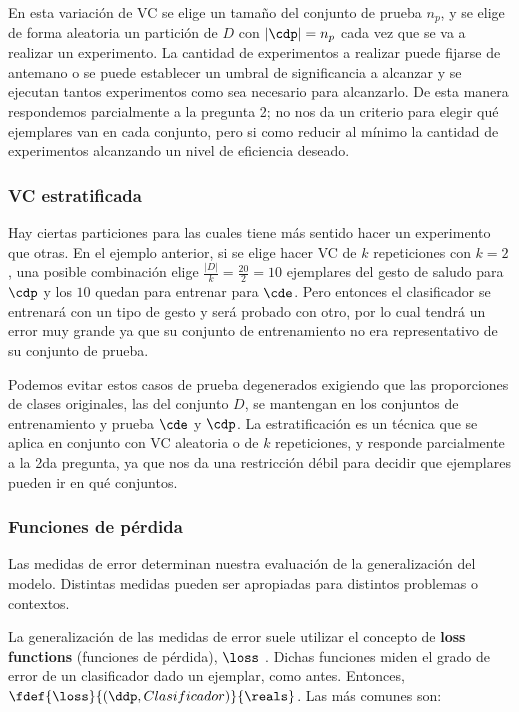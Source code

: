 En esta variación de VC se elige un tamaño del conjunto de prueba $n_p$, y se elige de forma aleatoria un partición de $D$ con $|\cdp|=n_p$ cada vez que se va a realizar un experimento. La cantidad de experimentos a realizar puede fijarse de antemano o se puede establecer un umbral de significancia a alcanzar y se ejecutan tantos experimentos como sea necesario para alcanzarlo. De esta manera respondemos parcialmente a la pregunta 2; no nos da un criterio para elegir qué ejemplares van en cada conjunto, pero si como reducir al mínimo la cantidad de experimentos alcanzando un nivel de eficiencia deseado.


\subsubsection{VC estratificada}

Hay ciertas particiones para las cuales tiene más sentido hacer un experimento que otras. En el ejemplo anterior, si se elige hacer VC de $k$ repeticiones con $k=2$, una posible combinación elige $\frac{|D|}{k}=\frac{20}{2}=10$ ejemplares del gesto de saludo para $\cdp$ y los $10$ quedan para entrenar para $\cde$. Pero entonces el clasificador se entrenará con un tipo de gesto y será probado con otro, por lo cual tendrá un error muy grande ya que su conjunto de entrenamiento no era representativo de su conjunto de prueba.

Podemos evitar estos casos de prueba degenerados exigiendo que las proporciones de clases originales, las del conjunto $D$, se mantengan en los conjuntos de entrenamiento y prueba $\cde$ y $\cdp$. La estratificación es un técnica que se aplica en conjunto con VC aleatoria o de $k$ repeticiones, y responde parcialmente a la 2da pregunta, ya que nos da una restricción débil para decidir que ejemplares pueden ir en qué conjuntos.
 



\subsubsection{Funciones de pérdida}

Las medidas de error determinan nuestra evaluación de la generalización del modelo. Distintas medidas pueden ser apropiadas para distintos problemas o contextos. 

La generalización de las medidas de error suele utilizar el concepto de \textbf{loss functions} (funciones de pérdida), $\loss$ \cite{wald1950}. Dichas funciones miden el grado de error de un clasificador dado un ejemplar, como antes. Entonces, $\fdef{\loss}{(\ddp,Clasificador)}{\reals}$. Las más comunes son:

